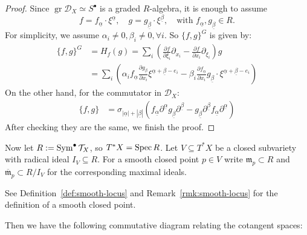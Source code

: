 \begin{proof}
    Since $\operatorname{gr}\mathcal{D}_X \simeq S^\bullet$ is a graded $R$-algebra, it is enough to assume
    \[
        f = f_{\underline{\alpha}} \cdot \xi^{\underline{\alpha}}, \quad
        g = g_{\underline{\beta}} \cdot \xi^{\underline{\beta}}, \quad \text{with } f_{\underline{\alpha}}, g_{\underline{\beta}} \in R.
    \]
    For simplicity, we assume $\alpha_i \neq 0, \beta_i \neq 0, \forall i$.
    So $\{f, g\}^G$ is given by:
    \begin{align*}
        \{f, g\}^G & = H_f(g) = \sum_i \left( \frac{\partial f}{\partial \xi_i} \partial_{x_i} - \frac{\partial f}{\partial x_i} \partial_{\xi_i} \right) g                                                                                                                                                                       \\
                   & = \sum_i \left( \alpha_i f_{\underline{\alpha}} \frac{\partial g_{\underline{\beta}}}{\partial x_i} \xi^{\underline{\alpha} + \underline{\beta} - e_i} - \beta_i \frac{\partial f_{\underline{\alpha}}}{\partial x_i} g_{\underline{\beta}} \cdot \xi^{\underline{\alpha} + \underline{\beta} - e_i} \right)
    \end{align*}
    On the other hand, for the commutator in $\mathcal{D}_X$:
    \begin{align*}
        \{f, g\} & = \sigma_{|\underline{\alpha}|+|\underline{\beta}|} \left( f_{\underline{\alpha}} \partial^{\underline{\alpha}} g_{\underline{\beta}} \partial^{\underline{\beta}} - g_{\underline{\beta}} \partial^{\underline{\beta}} f_{\underline{\alpha}} \partial^{\underline{\alpha}} \right)
    \end{align*}
    After checking they are the same, we finish the proof.
\end{proof}


Now let $R:=\operatorname{Sym}^\bullet \mathcal{T}_X$, so $T^\ast X=\operatorname{Spec} R$.  Let
$V\subseteq T^\ast X$ be a closed subvariety with radical ideal
$I_V\subseteq R$.  For a smooth closed point $p\in V$ write
$\mathfrak m_p\subset R$ and $\overline{\mathfrak m}_p\subset R/I_V$ for the
corresponding maximal ideals.

\begin{remark}
    See Definition~\ref{def:smooth-locus} and Remark~\ref{rmk:smooth-locus} for the definition of a smooth closed point.
\end{remark}

Then we have the following commutative diagram relating the cotangent spaces:

